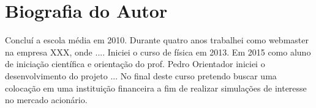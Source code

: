 \newpage

\chapter*{Biografia do Autor}

Concluí a escola média em 2010. Durante quatro anos trabalhei como webmaster
na empresa XXX, onde .... Iniciei o curso de física em 2013. Em 2015 como
aluno de iniciação científica e orientação do prof. Pedro Orientador
iniciei o desenvolvimento do projeto ... No final deste curso pretendo
buscar uma colocação em uma instituição financeira a fim de realizar
simulações de interesse no mercado acionário.

\newpage

$ $

